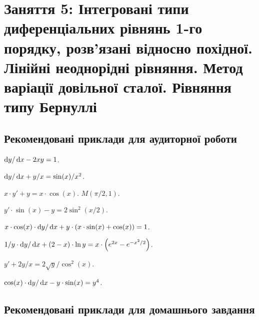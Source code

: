 \section*{Заняття 5: Інтегровані типи диференціальних рівнянь 1-го порядку, розв'язані відносно похідної. Лінійні неоднорідні рівняння. Метод варіації довільної сталої. Рівняння типу Бернуллі}

\subsection*{Рекомендовані приклади для аудиторної роботи}

\begin{problem}
	$\mathop{}\!\mathrm{d} y / \mathop{}\!\mathrm{d} x - 2 x y = 1$.
\end{problem}

\begin{problem}
	$\mathop{}\!\mathrm{d} y / \mathop{}\!\mathrm{d} x + y / x = \sin (x) / x^2$.
\end{problem}

\begin{problem}
	$x \cdot y' + y = x \cdot \cos(x)$.  $M(\pi / 2, 1)$.
\end{problem}

\begin{problem}
	$y' \cdot \sin (x) - y = 2 \sin^2 (x / 2)$.
\end{problem}

\begin{problem}
	$x \cdot \cos (x) \cdot \mathop{}\!\mathrm{d} y / \mathop{}\!\mathrm{d} x + y \cdot (x \cdot \sin (x) + \cos (x)) = 1$.
\end{problem}

\begin{problem}
	$1 / y \cdot \mathop{}\!\mathrm{d} y / \mathop{}\!\mathrm{d} x + (2 - x) \cdot \ln y = x \cdot \left( e^{2 x} - e^{-x^2 / 2} \right)$.
\end{problem}

\begin{problem}
	$y' + 2 y / x = 2 \sqrt{y} / \cos^2 (x)$.
\end{problem}

\begin{problem}
	$\cos(x) \cdot \mathop{}\!\mathrm{d} y / \mathop{}\!\mathrm{d} x - y \cdot \sin (x) = y^4$.
\end{problem}

\subsection*{Рекомендовані приклади для домашнього завдання}

